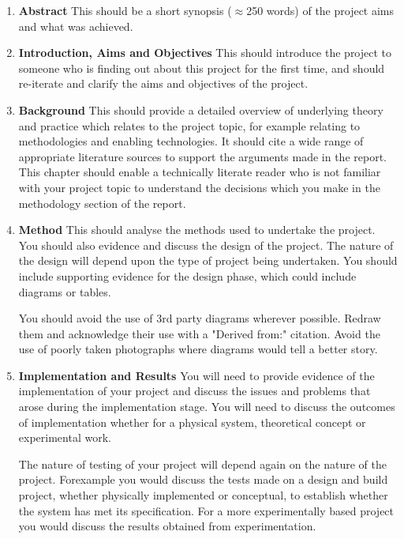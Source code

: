 \begin{enumerate}
    \item \textbf{Abstract}
    \subitem This should be a short synopsis ($\approx$250 words) of the project aims and what was achieved.

    \item \textbf{Introduction, Aims and Objectives}
    \subitem This should introduce the project to someone who is finding out about this project for the first time, and should re-iterate and clarify the aims and objectives of the project.

    \item \textbf{Background}
    \subitem This should provide a detailed overview of underlying theory and practice which relates to the project topic, for example relating to methodologies and enabling technologies. It should cite a wide range of appropriate literature sources to support the arguments made in the report. This chapter should enable a technically literate reader who is not familiar with your project topic to understand the decisions which you make in the methodology section of the report.

    \item \textbf{Method}
    \subitem This should analyse the methods used to undertake the project. You should also evidence and discuss the design of the project. The nature of the design will depend upon the type of project being undertaken. You should include supporting evidence for the design phase, which could include diagrams or tables.

    \begin{tcolorbox}
        You should avoid the use of 3rd party diagrams wherever possible. Redraw them and acknowledge their use with a "Derived from:" citation. Avoid the use of poorly taken photographs where diagrams would tell a better story.
    \end{tcolorbox}

    \item \textbf{Implementation and Results}
    \subitem You will need to provide evidence of the implementation of your project and discuss the issues and problems that arose during the implementation stage. You will need to discuss the outcomes of implementation whether for a physical system, theoretical concept or experimental work.

    The nature of testing of your project will depend again on the nature of the project. Forexample you would discuss the tests made on a design and build project, whether physically implemented or conceptual, to establish whether the system has met its specification. For a more experimentally based project you would discuss the results obtained from experimentation.


\end{enumerate}
